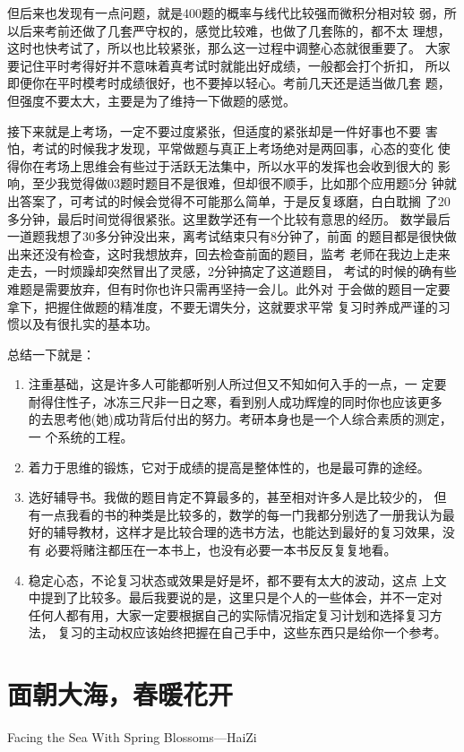 \documentclass[11pt,twoside,openany,x11names,svgnames]{memoir}
\begin{document}
但后来也发现有一点问题，就是400题的概率与线代比较强而微积分相对较
弱，所以后来考前还做了几套严守权的，感觉比较难，也做了几套陈的，都不太
理想，这时也快考试了，所以也比较紧张，那么这一过程中调整心态就很重要了。
大家要记住平时考得好并不意味着真考试时就能出好成绩，一般都会打个折扣，
所以即便你在平时模考时成绩很好，也不要掉以轻心。考前几天还是适当做几套
题，但强度不要太大，主要是为了维持一下做题的感觉。

接下来就是上考场，一定不要过度紧张，但适度的紧张却是一件好事也不要
害怕，考试的时候我才发现，平常做题与真正上考场绝对是两回事，心态的变化
使得你在考场上思维会有些过于活跃无法集中，所以水平的发挥也会收到很大的
影响，至少我觉得做03题时题目不是很难，但却很不顺手，比如那个应用题5分
钟就出答案了，可考试的时候会觉得不可能那么简单，于是反复琢磨，白白耽搁
了20多分钟，最后时间觉得很紧张。这里数学还有一个比较有意思的经历。
数学最后一道题我想了30多分钟没出来，离考试结束只有8分钟了，前面
的题目都是很快做出来还没有检查，这时我想放弃，回去检查前面的题目，监考
老师在我边上走来走去，一时烦躁却突然冒出了灵感，2分钟搞定了这道题目，
考试的时候的确有些难题是需要放弃，但有时你也许只需再坚持一会儿。此外对
于会做的题目一定要拿下，把握住做题的精准度，不要无谓失分，这就要求平常
复习时养成严谨的习惯以及有很扎实的基本功。

总结一下就是：
\begin{enumerate}
\item 注重基础，这是许多人可能都听别人所过但又不知如何入手的一点，一
定要耐得住性子，冰冻三尺非一日之寒，看到别人成功辉煌的同时你也应该更多
的去思考他(她)成功背后付出的努力。考研本身也是一个人综合素质的测定，一
个系统的工程。
\item 着力于思维的锻炼，它对于成绩的提高是整体性的，也是最可靠的途经。
\item 选好辅导书。我做的题目肯定不算最多的，甚至相对许多人是比较少的，
但有一点我看的书的种类是比较多的，数学的每一门我都分别选了一册我认为最
好的辅导教材，这样才是比较合理的选书方法，也能达到最好的复习效果，没有
必要将赌注都压在一本书上，也没有必要一本书反反复复地看。
\item 稳定心态，不论复习状态或效果是好是坏，都不要有太大的波动，这点
上文中提到了比较多。最后我要说的是，这里只是个人的一些体会，并不一定对
任何人都有用，大家一定要根据自己的实际情况指定复习计划和选择复习方法，
复习的主动权应该始终把握在自己手中，这些东西只是给你一个参考。
\end{enumerate}
\section{面朝大海，春暖花开}
Facing the Sea With Spring Blossoms—HaiZi
\end{document}

